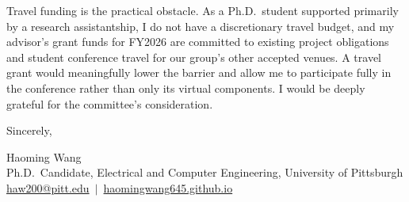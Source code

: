 \documentclass[11pt, letterpaper]{article}
\begin{document}
Travel funding is the practical obstacle. As a Ph.D.\ student supported primarily by a research assistantship, I do not have a discretionary travel budget, and my advisor's grant funds for FY2026 are committed to existing project obligations and student conference travel for our group's other accepted venues. A travel grant would meaningfully lower the barrier and allow me to participate fully in the conference rather than only its virtual components. I would be deeply grateful for the committee's consideration.

\vspace{0.4em}

\noindent Sincerely,

\vspace{0.6em}

\noindent Haoming Wang \\
Ph.D.\ Candidate, Electrical and Computer Engineering, University of Pittsburgh \\
\href{mailto:haw200@pitt.edu}{haw200@pitt.edu} \,$|$\, \href{https://haomingwang645.github.io/}{haomingwang645.github.io}
\end{document}
